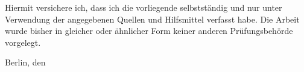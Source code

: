 

Hiermit versichere ich, dass ich die vorliegende \thethesistyp{} selbstständig und nur unter
Verwendung der angegebenen Quellen und Hilfsmittel verfasst habe. 
Die Arbeit wurde bisher in gleicher oder ähnlicher Form keiner anderen Prüfungsbehörde vorgelegt.

\vskip 1cm

Berlin, den \thedatum

\vskip 1.5cm

\theautor